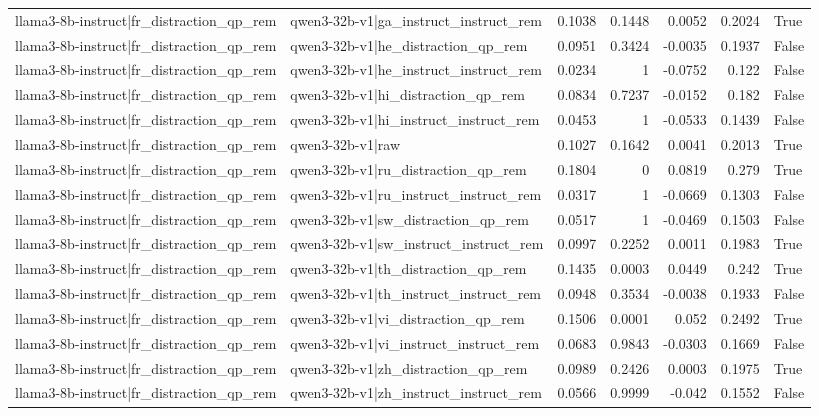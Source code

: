 \begin{table}
\begin{tabular}{l l r r r r l}
llama3-8b-instruct|fr_distraction_qp_rem & qwen3-32b-v1|ga_instruct_instruct_rem & 0.1038 & 0.1448 & 0.0052 & 0.2024 & True \\
llama3-8b-instruct|fr_distraction_qp_rem & qwen3-32b-v1|he_distraction_qp_rem & 0.0951 & 0.3424 & -0.0035 & 0.1937 & False \\
llama3-8b-instruct|fr_distraction_qp_rem & qwen3-32b-v1|he_instruct_instruct_rem & 0.0234 & 1 & -0.0752 & 0.122 & False \\
llama3-8b-instruct|fr_distraction_qp_rem & qwen3-32b-v1|hi_distraction_qp_rem & 0.0834 & 0.7237 & -0.0152 & 0.182 & False \\
llama3-8b-instruct|fr_distraction_qp_rem & qwen3-32b-v1|hi_instruct_instruct_rem & 0.0453 & 1 & -0.0533 & 0.1439 & False \\
llama3-8b-instruct|fr_distraction_qp_rem & qwen3-32b-v1|raw & 0.1027 & 0.1642 & 0.0041 & 0.2013 & True \\
llama3-8b-instruct|fr_distraction_qp_rem & qwen3-32b-v1|ru_distraction_qp_rem & 0.1804 & 0 & 0.0819 & 0.279 & True \\
llama3-8b-instruct|fr_distraction_qp_rem & qwen3-32b-v1|ru_instruct_instruct_rem & 0.0317 & 1 & -0.0669 & 0.1303 & False \\
llama3-8b-instruct|fr_distraction_qp_rem & qwen3-32b-v1|sw_distraction_qp_rem & 0.0517 & 1 & -0.0469 & 0.1503 & False \\
llama3-8b-instruct|fr_distraction_qp_rem & qwen3-32b-v1|sw_instruct_instruct_rem & 0.0997 & 0.2252 & 0.0011 & 0.1983 & True \\
llama3-8b-instruct|fr_distraction_qp_rem & qwen3-32b-v1|th_distraction_qp_rem & 0.1435 & 0.0003 & 0.0449 & 0.242 & True \\
llama3-8b-instruct|fr_distraction_qp_rem & qwen3-32b-v1|th_instruct_instruct_rem & 0.0948 & 0.3534 & -0.0038 & 0.1933 & False \\
llama3-8b-instruct|fr_distraction_qp_rem & qwen3-32b-v1|vi_distraction_qp_rem & 0.1506 & 0.0001 & 0.052 & 0.2492 & True \\
llama3-8b-instruct|fr_distraction_qp_rem & qwen3-32b-v1|vi_instruct_instruct_rem & 0.0683 & 0.9843 & -0.0303 & 0.1669 & False \\
llama3-8b-instruct|fr_distraction_qp_rem & qwen3-32b-v1|zh_distraction_qp_rem & 0.0989 & 0.2426 & 0.0003 & 0.1975 & True \\
llama3-8b-instruct|fr_distraction_qp_rem & qwen3-32b-v1|zh_instruct_instruct_rem & 0.0566 & 0.9999 & -0.042 & 0.1552 & False \\

\end{tabular}
\end{table}

